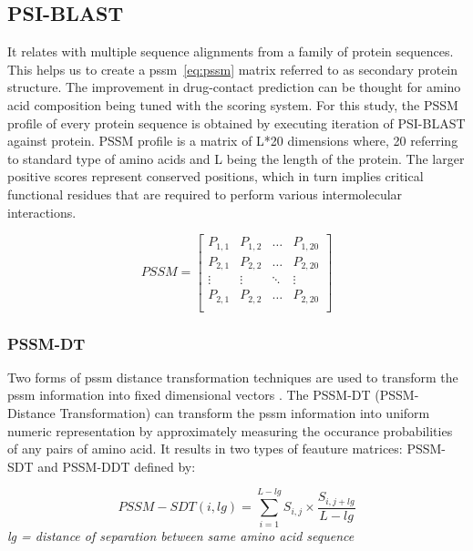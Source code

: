 \subsection{PSI-BLAST}
It relates with multiple sequence alignments from a family of protein sequences\cite{Schaffer2001}. This helps us to create a \acrshort{pssm}~\ref{eq:pssm} matrix referred to as secondary protein structure. The improvement in drug-contact prediction can be thought for amino acid composition being tuned with the scoring system. For this study, the PSSM profile of every protein sequence is obtained by executing iteration of PSI-BLAST against \cite[KEGG]{Schaffer2001} protein. PSSM profile is a matrix of L*20 dimensions where, 20 referring to standard type of amino acids and L being the length of the protein. The larger positive scores represent conserved positions, which in turn implies critical functional residues that are required to perform various intermolecular interactions.\cite[PSSM]{Schaffer2001}

\begin{equation}
  PSSM = \begin{bmatrix}
    P_{1,1} & P_{1,2} & \dots & P_{1,20} \\
    P_{2,1} & P_{2,2} & \dots & P_{2,20} \\
    \vdots  & \vdots  & \ddots & \vdots \\
    P_{2,1} & P_{2,2} & \dots & P_{2,20} \\
  \end{bmatrix}
  \label{eq:pssm}
\end{equation}

\subsubsection{PSSM-DT}
Two forms of \acrshort{pssm} distance transformation techniques are used to transform the \acrshort{pssm} information into fixed dimensional vectors \cite{Xu2015}. The PSSM-DT (PSSM-Distance Transformation) can transform the \acrshort{pssm} information into uniform numeric representation by approximately measuring the occurance probabilities of any pairs of amino acid. It results in two types of feauture matrices: PSSM-SDT and PSSM-DDT defined by:

\begin{equation}
  PSSM-SDT(i,lg) = \sum_{i=1}^{L-lg} S_{i,j} \times \frac{ S_{i,j+lg} }{L-lg} 
  \label{eq:pssmsdt}
\end{equation}
\textit{\center lg =  distance of separation between same amino acid sequence}

